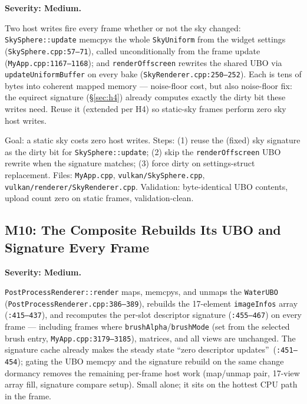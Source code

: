 \documentclass[11pt,a4paper]{article}
\begin{document}
\textbf{Severity: Medium.}

Two host writes fire every frame whether or not the sky changed:
\texttt{SkySphere::update} memcpys the whole \texttt{SkyUniform} from the
widget settings (\texttt{SkySphere.cpp:57--71}), called unconditionally from
the frame update (\texttt{MyApp.cpp:1167--1168}); and
\texttt{renderOffscreen} rewrites the shared UBO via
\texttt{updateUniformBuffer} on every bake (\texttt{SkyRenderer.cpp:250--252}).
Each is tens of bytes into coherent mapped memory --- noise-floor cost, but
also noise-floor fix: the equirect signature (\S\ref{sec:h4}) already
computes exactly the dirty bit these writes need. Reuse it (extended per
H4) so static-sky frames perform zero sky host writes.

\begin{tcolorbox}[promptbox={Prompt --- M9: dirty-gated sky uploads}]
Goal: a static sky costs zero host writes. Steps: (1) reuse the (fixed) sky
signature as the dirty bit for \texttt{SkySphere::update}; (2) skip the
\texttt{renderOffscreen} UBO rewrite when the signature matches; (3) force
dirty on settings-struct replacement. Files: \texttt{MyApp.cpp},
\texttt{vulkan/SkySphere.cpp}, \texttt{vulkan/renderer/SkyRenderer.cpp}.
Validation: byte-identical UBO contents, upload count zero on static frames,
validation-clean.
\end{tcolorbox}

\subsection{M10: The Composite Rebuilds Its UBO and Signature Every Frame}
\label{sec:m10}

\textbf{Severity: Medium.}

\texttt{PostProcessRenderer::render} maps, memcpys, and unmaps the
\texttt{WaterUBO} (\texttt{PostProcessRenderer.cpp:386--389}), rebuilds the
17-element \texttt{imageInfos} array (\texttt{:415--437}), and recomputes the
per-slot descriptor signature (\texttt{:455--467}) on every frame ---
including frames where \texttt{brushAlpha}/\texttt{brushMode} (set from the
selected brush entry, \texttt{MyApp.cpp:3179--3185}), matrices, and all
views are unchanged. The signature cache already makes the steady state
\textquotedblleft zero descriptor updates\textquotedblright\ (\texttt{:451--454});
gating the UBO memcpy and the signature rebuild on the same change dormancy
removes the remaining per-frame host work (map/unmap pair, 17-view array
fill, signature compare setup). Small alone; it sits on the hottest CPU
path in the frame.
\end{document}
